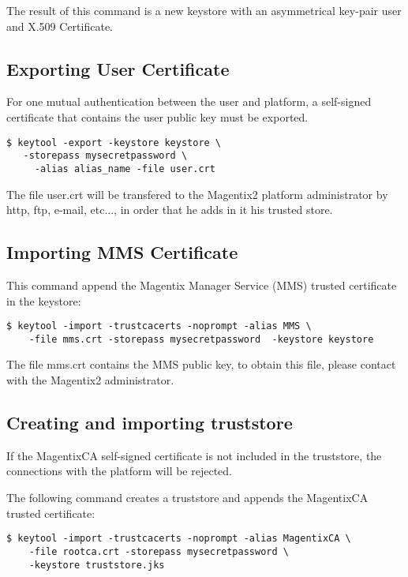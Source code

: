 The result of this command is a new keystore with an  asymmetrical key-pair user and X.509 Certificate.

\subsection{Exporting User Certificate}
For one mutual authentication between the user and platform, a self-signed certificate that contains the user public key must be exported.

\begin{verbatim}
$ keytool -export -keystore keystore \
   -storepass mysecretpassword \
	 -alias alias_name -file user.crt
\end{verbatim}


The file user.crt will be transfered to the Magentix2 platform administrator by http, ftp, e-mail, etc..., in order that he adds in it his trusted store. 


\subsection{Importing MMS Certificate}
\label{sec:importingMMS}

This command append the Magentix Manager Service (MMS) trusted certificate in the keystore:
\begin{verbatim}
$ keytool -import -trustcacerts -noprompt -alias MMS \
	-file mms.crt -storepass mysecretpassword  -keystore keystore
\end{verbatim}

The file mms.crt contains the MMS public key, to obtain this file, please contact with the Magentix2 administrator.


\subsection{Creating and importing truststore}

If the MagentixCA self-signed certificate is not included in the truststore, the connections with the platform will be rejected. 

The following command creates a truststore and appends the MagentixCA trusted certificate:
\begin{verbatim}
$ keytool -import -trustcacerts -noprompt -alias MagentixCA \
	-file rootca.crt -storepass mysecretpassword \
	-keystore truststore.jks
\end{verbatim}

